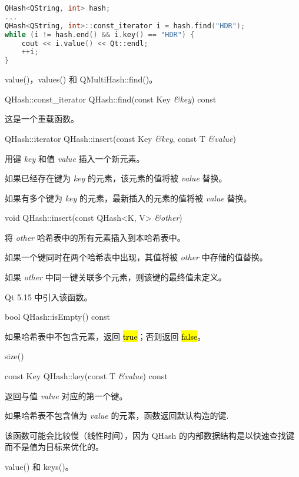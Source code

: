 \begin{lstlisting}[language=C++]
QHash<QString, int> hash;
...
QHash<QString, int>::const_iterator i = hash.find("HDR");
while (i != hash.end() && i.key() == "HDR") {
    cout << i.value() << Qt::endl;
    ++i;
}
\end{lstlisting}

\begin{seeAlso}
value()，values() 和 QMultiHash::find()。
\end{seeAlso}

QHash::const\_iterator QHash::find(const Key \emph{\&key}) const

这是一个重载函数。

QHash::iterator QHash::insert(const Key \emph{\&key}, const T \emph{\&value})

用键 \emph{key} 和值 \emph{value} 插入一个新元素。

如果已经存在键为 \emph{key} 的元素，该元素的值将被 \emph{value} 替换。

如果有多个键为 \emph{key} 的元素，最新插入的元素的值将被 \emph{value }替换。

void QHash::insert(const QHash<K, V> \emph{\&other})

将 \emph{other} 哈希表中的所有元素插入到本哈希表中。

如果一个键同时在两个哈希表中出现，其值将被 \emph{other} 中存储的值替换。

\begin{notice}
如果 \emph{other} 中同一键关联多个元素，则该键的最终值未定义。
\end{notice}

Qt 5.15 中引入该函数。

bool QHash::isEmpty() const

如果哈希表中不包含元素，返回 \hl{true}；否则返回 \hl{false}。

\begin{seeAlso}
size()
\end{seeAlso}

const Key QHash::key(const T \emph{\&value}) const

返回与值 \emph{value} 对应的第一个键。

如果哈希表不包含值为 \emph{value} 的元素，函数返回默认构造的键.

该函数可能会比较慢（线性时间），因为 QHash 的内部数据结构是以快速查找键而不是值为目标来优化的。

\begin{seeAlso}
value() 和 keys()。
\end{seeAlso}

